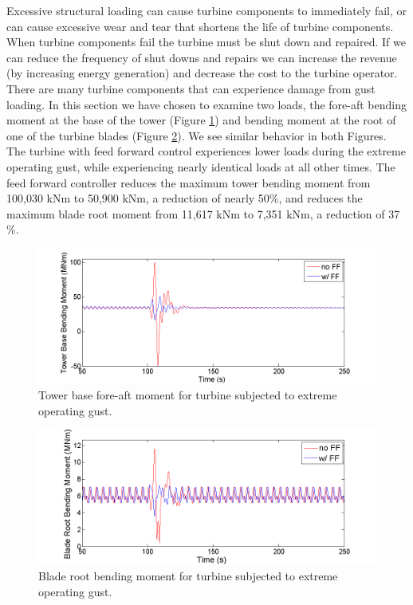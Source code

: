 Excessive structural loading can cause turbine components to immediately fail, or can cause excessive wear and tear that shortens the life of turbine components. When turbine components fail the turbine must be shut down and repaired. If we can reduce the frequency of shut downs and repairs we can increase the revenue (by increasing energy generation) and decrease the cost to the turbine operator. There are many turbine components that can experience damage from gust loading. In this section we have chosen to examine two loads, the fore-aft bending moment at the base of the tower (Figure \ref{fig3-16}) and bending moment at the root of one of the turbine blades (Figure \ref{fig3-17}). We see similar behavior in both Figures. The turbine with feed forward control experiences lower loads during the extreme operating gust, while experiencing nearly identical loads at all other times. The feed forward controller reduces the maximum tower bending moment from 100,030 kNm to 50,900 kNm, a reduction of nearly 50$\%$, and reduces the maximum blade root moment from 11,617 kNm to 7,351 kNm, a reduction of 37$\%$.

\begin{figure}[htbp]
	\centering
		\includegraphics[width = \linewidth]{Figures/ch3Figures/fig3-16.png}
		
	\caption{Tower base fore-aft moment for turbine subjected to extreme operating gust.}
	\label{fig3-16}
\end{figure}

\begin{figure}[htbp]
	\centering
		\includegraphics[width = \linewidth]{Figures/ch3Figures/fig3-17.png}
		
	\caption{Blade root bending moment for turbine subjected to extreme operating gust.}
	\label{fig3-17}
\end{figure}

